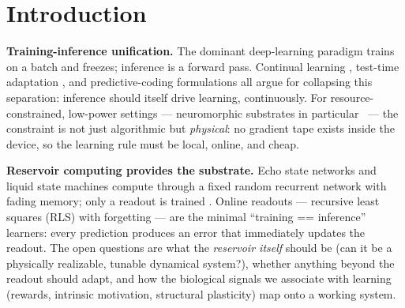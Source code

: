 \documentclass[11pt]{article}
\begin{document}
\section{Introduction}
\label{sec:intro}

\textbf{Training-inference unification.} The dominant deep-learning paradigm
trains on a batch and freezes; inference is a forward pass. Continual learning
\cite{parisi2019,kirkpatrick2017}, test-time adaptation \cite{sun2020}, and predictive-coding
formulations \cite{rao1999,friston2010} all argue for collapsing this
separation: inference should itself drive learning, continuously. For
resource-constrained, low-power settings --- neuromorphic substrates in
particular~\cite{strukov2008} --- the constraint is not just algorithmic but \emph{physical}: no
gradient tape exists inside the device, so the learning rule must be local,
online, and cheap.

\textbf{Reservoir computing provides the substrate.} Echo state networks
\cite{jaeger2001} and liquid state machines \cite{maass2002} compute through a
fixed random recurrent network with fading memory; only a readout is trained
\cite{lukosevicius2009}.
Online readouts --- recursive least squares (RLS) with forgetting
\cite{haykin2002} --- are the minimal ``training == inference'' learners: every prediction produces an error
that immediately updates the readout. The open questions are what the
\emph{reservoir itself} should be (can it be a physically realizable, tunable
dynamical system?), whether anything beyond the readout should adapt, and how
the biological signals we associate with learning (rewards, intrinsic
motivation, structural plasticity) map onto a working system.
\end{document}
